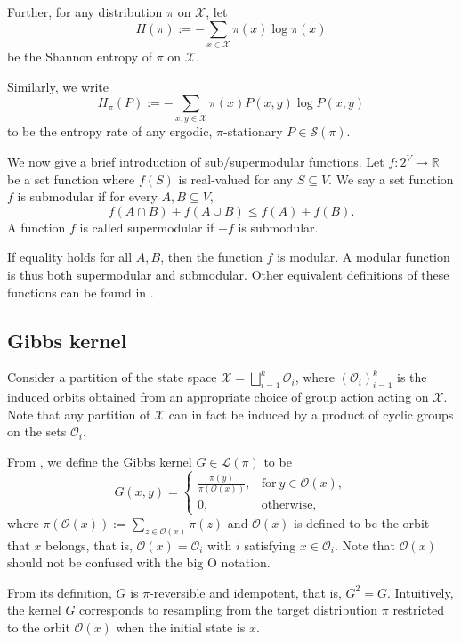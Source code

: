 \documentclass[EJP]{ejpecp} %
\begin{document}
Further, for any distribution $\pi$ on $\mathcal{X}$, let 
$$H(\pi) := -\sum_{x\in \mathcal{X}} \pi(x) \log \pi(x)$$
be the Shannon entropy of $\pi$ on $\mathcal{X}$.

Similarly, we write 
$$H_\pi(P) := -\sum_{x, y \in \mathcal{X}} \pi(x)P(x,y)\log P(x,y)$$
to be the entropy rate of any ergodic, $\pi$-stationary $P \in \mathcal{S}(\pi)$.

We now give a brief introduction of sub/supermodular functions. Let $f: 2^V \to \mathbb{R}$ be a set function where $f(S)$ is real-valued for any $S \subseteq V.$ We say a set function $f$ is submodular if for every $A, B \subseteq V,$
$$f(A \cap B) + f(A \cup B) \leq f(A) + f(B).$$ A function $f$ is called supermodular if $-f$ is submodular. 

If equality holds for all $A, B$, then the function $f$ is modular. A modular function is thus both supermodular and submodular. Other equivalent definitions of these functions can be found in \cite{Krause_Golovin_2014}.

\subsection{Gibbs kernel}
Consider a partition of the state space $\mathcal{X} = \bigsqcup_{i=1}^k \mathcal{O}_i$, where $(\mathcal{O}_i)_{i=1}^k$ is the induced orbits obtained from an appropriate choice of group action acting on $\mathcal{X}$. Note that any partition of $\mathcal{X}$ can in fact be induced by a product of cyclic groups on the sets $\mathcal{O}_i$.

From \cite{GPG}, we define the Gibbs kernel $G \in \mathcal{L}(\pi)$ to be 
\begin{equation*} 
G(x,y) = \begin{cases}
\frac{\pi(y)}{\pi(\mathcal{O}(x))},& \mathrm{for}\ y \in \mathcal{O}(x),\\
0, & \mathrm{otherwise},
\end{cases}
\end{equation*}
where $\pi(\mathcal{O}(x)) := \sum_{z \in \mathcal{O}(x)} \pi(z)$ and $\mathcal{O}(x)$ is defined to be the orbit that $x$ belongs, that is, $\mathcal{O}(x) = \mathcal{O}_i$ with $i$ satisfying $x \in \mathcal{O}_i$. Note that $\mathcal{O}(x)$ should not be confused with the big O notation.

From its definition, $G$ is $\pi$-reversible and idempotent, that is, $G^2 = G.$ Intuitively, the kernel $G$ corresponds to resampling from the target distribution $\pi$ restricted to the orbit $\mathcal{O}(x)$ when the initial state is $x$. 
\end{document}
